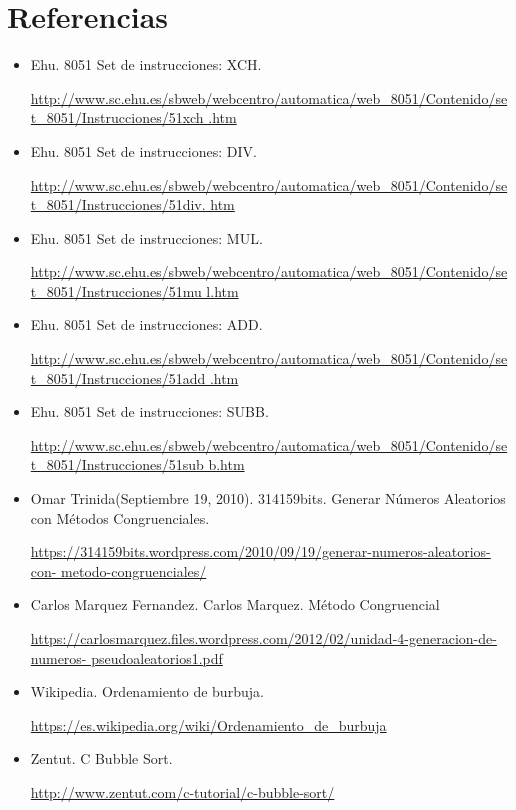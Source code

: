 \documentclass[doc, donotrepeattitle, biblatex, apacite]{apa6}
\begin{document}
\section{Referencias}
\begin{itemize}
\item Ehu. 8051 Set de instrucciones: XCH.

\url{http://www.sc.ehu.es/sbweb/webcentro/automatica/web_8051/Contenido/set_8051/Instrucciones/51xch
.htm}

\item Ehu. 8051 Set de instrucciones: DIV.

\url{http://www.sc.ehu.es/sbweb/webcentro/automatica/web_8051/Contenido/set_8051/Instrucciones/51div.
htm}

\item Ehu. 8051 Set de instrucciones: MUL.

\url{http://www.sc.ehu.es/sbweb/webcentro/automatica/web_8051/Contenido/set_8051/Instrucciones/51mu
l.htm}

\item Ehu. 8051 Set de instrucciones: ADD.

\url{http://www.sc.ehu.es/sbweb/webcentro/automatica/web_8051/Contenido/set_8051/Instrucciones/51add
.htm}

\item Ehu. 8051 Set de instrucciones: SUBB.

\url{http://www.sc.ehu.es/sbweb/webcentro/automatica/web_8051/Contenido/set_8051/Instrucciones/51sub
b.htm}

\item Omar Trinida(Septiembre 19, 2010). 314159bits. Generar Números Aleatorios con Métodos
Congruenciales.

\url{https://314159bits.wordpress.com/2010/09/19/generar-numeros-aleatorios-con-
metodo-congruenciales/}

\item Carlos Marquez Fernandez. Carlos Marquez. Método Congruencial

\url{https://carlosmarquez.files.wordpress.com/2012/02/unidad-4-generacion-de-numeros-
pseudoaleatorios1.pdf}

\item Wikipedia. Ordenamiento de burbuja. 

\url{https://es.wikipedia.org/wiki/Ordenamiento_de_burbuja}

\item Zentut. C Bubble Sort. 

\url{http://www.zentut.com/c-tutorial/c-bubble-sort/}
\end{itemize}
\end{document}
